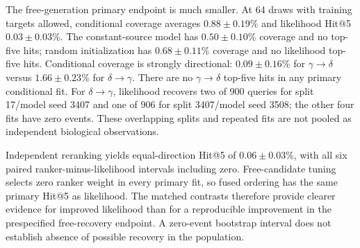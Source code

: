 \documentclass[10pt]{article}
\newcommand{\gtd}{\ensuremath{\gamma\!\rightarrow\!\delta}}
\newcommand{\dtg}{\ensuremath{\delta\!\rightarrow\!\gamma}}
\begin{document}
The free-generation primary endpoint is much smaller. At 64 draws with
training targets allowed, conditional coverage averages $0.88\pm0.19\%$ and
likelihood Hit@5 $0.03\pm0.03\%$. The constant-source model has
$0.50\pm0.10\%$ coverage and no top-five hits; random initialization has
$0.68\pm0.11\%$ coverage and no likelihood top-five hits. Conditional coverage
is strongly directional: $0.09\pm0.16\%$ for \gtd{} versus
$1.66\pm0.23\%$ for \dtg{}. There are no \gtd{} top-five hits in any primary
conditional fit. For \dtg{}, likelihood recovers two of 900 queries for
split 17/model seed 3407 and one of 906 for split 3407/model seed 3508;
the other four fits have zero events. These overlapping splits and repeated
fits are not pooled as independent biological observations.

Independent reranking yields equal-direction Hit@5 of $0.06\pm0.03\%$, with
all six paired ranker-minus-likelihood intervals including zero. Free-candidate
tuning selects zero ranker weight in every primary fit, so fused ordering has
the same primary Hit@5 as likelihood. The matched contrasts therefore provide
clearer evidence for improved likelihood than for a reproducible improvement
in the prespecified free-recovery endpoint. A zero-event bootstrap interval
does not establish absence of possible recovery in the population.
\end{document}
